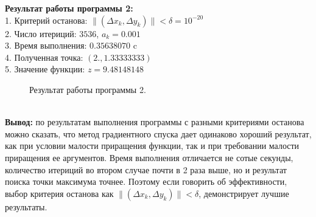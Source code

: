 \documentclass[a5paper, 10pt]{article}
\theoremstyle{definition}
\theoremstyle{plain}
\theoremstyle{remark}
\begin{document}
\textbf{Результат работы программы 2:}\\
1. Критерий останова: $\| ( \Delta x_k, \Delta y_k  ) \| < \delta = 10^{-20}$\\
2. Число итериций: $3536$, $a_k = 0.001$\\
3. Время выполнения: $0.35638070$ c\\
4. Полученная точка: $(2., 1.33333333)$\\
5. Значение функции: $z = 9.48148148$\\
\begin{figure}[h]
\caption{Результат работы программы 2.}
\end{figure}
\\
\textbf{Вывод:} по результатам выполнения программы с разными критериями останова можно сказать, что метод градиентного спуска дает одинаково хороший результат, как при условии малости приращения функции, так и при требовании малости приращения ее аргументов. Время выполнения отличается не сотые секунды, количество итериций во втором случае почти в 2 раза выше, но и результат поиска точки максимума точнее. Поэтому если говорить об эффективности, выбор критерия останова как $\| ( \Delta x_k, \Delta y_k  ) \| < \delta$, демонстрирует лучшие результаты.
\end{document}
